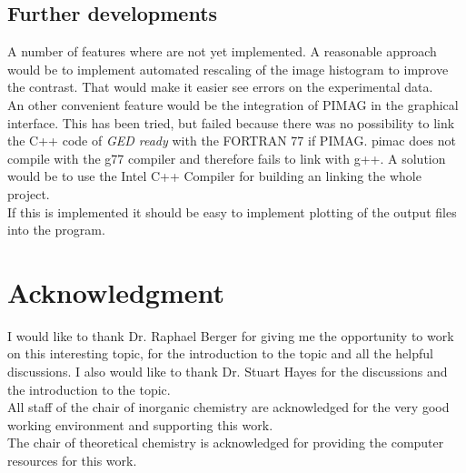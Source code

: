 \subsection{Further developments} 
A number of features where are not yet implemented. A reasonable approach would be to implement automated rescaling of the image histogram to improve the contrast. That would make it easier see errors on the experimental data. \\
An other convenient feature would be the integration of PIMAG in the graphical interface. This has been tried, but failed because there was no possibility to link the C++ code of \textit{GED ready} with the FORTRAN 77 if PIMAG. pimac does not compile with the g77 compiler and therefore fails to link with g++. A solution would be to use the Intel C++ Compiler for building an linking the whole project. \\
If this is implemented it should be easy to implement plotting of the output files into the program.  
\newpage

\section*{Acknowledgment}
I would like to thank Dr. Raphael Berger for giving me the opportunity to work on this interesting topic, for the introduction to the topic and all the helpful discussions. I also would like to thank Dr. Stuart Hayes for the discussions and the introduction to the topic. \\
All staff of the chair of inorganic chemistry are acknowledged for the very good working  environment and supporting this work. \\
The chair of theoretical chemistry is acknowledged for providing the computer resources for this work. 
\newpage


